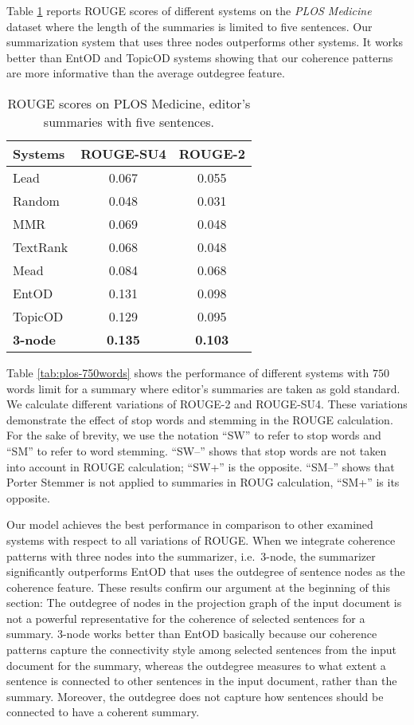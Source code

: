 Table \ref{table:plos_5len_editor} reports ROUGE scores of different systems on the \emph{PLOS Medicine} dataset where the length of the summaries is limited to five sentences. 
Our summarization system that uses three nodes outperforms other systems.  
It works better than EntOD and TopicOD systems showing that our coherence patterns are more informative than the average outdegree feature. 


\begin{table}[!ht]
	\begin{center}
		\begin{tabular}{lcc}
		\toprule
		\textbf{Systems} 			& \textbf{ROUGE-SU4} &\textbf{ROUGE-2}\\
		\midrule
		Lead 				& 0.067 	& 0.055  \\
		Random 				& 0.048  	& 0.031  \\
		MMR 				& 0.069 	& 0.048  \\
		TextRank 			& 0.068  	& 0.048  \\
		Mead 				& 0.084 	& 0.068  \\
		EntOD 				& 0.131		& 0.098  \\
		TopicOD				& 0.129 	& 0.095  \\
		\textbf{3-node} 				& \textbf{0.135} & \textbf{0.103} \\
		\bottomrule
		\end{tabular}
	\end{center}
	\caption{
	ROUGE scores on PLOS Medicine, editor's summaries with five sentences.}
	\label{table:plos_5len_editor}
\end{table}


Table \ref{tab:plos-750words} shows the performance of different systems with $750$ words limit for a summary where editor's summaries are taken as gold standard. 
We calculate different variations of ROUGE-2 and ROUGE-SU4. 
These variations demonstrate the effect of stop words and stemming in the ROUGE calculation.
For the sake of brevity, we use the notation ``SW'' to refer to stop words and ``SM'' to refer to word stemming.  
``SW--'' shows that stop words are not taken into account in ROUGE calculation; ``SW+'' is the opposite. 
``SM--'' shows that Porter Stemmer is not applied to summaries in ROUG calculation, ``SM+'' is its opposite. 
 
Our model achieves the best performance in comparison to other examined systems with respect to all variations of ROUGE. 
When we integrate coherence patterns with three nodes into the summarizer, i.e.\ 3-node, the summarizer significantly outperforms EntOD that uses the outdegree of sentence nodes as the coherence feature.   
These results confirm our argument at the beginning of this section: The outdegree of nodes in the projection graph of the input document is not a powerful representative for the coherence of selected sentences for a summary. 
3-node works better than EntOD basically because our coherence patterns capture the connectivity style among selected sentences from the input document for the summary, whereas
the outdegree measures to what extent a sentence is connected to other sentences in the input document, rather than the summary. 
Moreover, the outdegree does not capture how sentences should be connected to have a coherent summary.  

